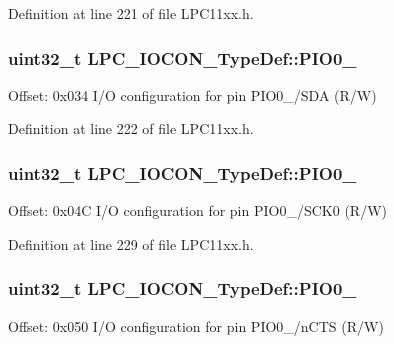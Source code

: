 Definition at line 221 of file L\+P\+C11xx.\+h.

\subsubsection[{\texorpdfstring{P\+I\+O0\+\_\+5}{PIO0_5}}]{ uint32\+\_\+t L\+P\+C\+\_\+\+I\+O\+C\+O\+N\+\_\+\+Type\+Def\+::\+P\+I\+O0\+\_}\hypertarget{group___l_p_c11xx___definitions_ga47080726daee765a484a0788c2a99228}{}\label{group___l_p_c11xx___definitions_ga47080726daee765a484a0788c2a99228}
Offset\+: 0x034 I/O configuration for pin P\+I\+O0\+\_/\+S\+DA (R/W) 

Definition at line 222 of file L\+P\+C11xx.\+h.

\subsubsection[{\texorpdfstring{P\+I\+O0\+\_\+6}{PIO0_6}}]{ uint32\+\_\+t L\+P\+C\+\_\+\+I\+O\+C\+O\+N\+\_\+\+Type\+Def\+::\+P\+I\+O0\+\_}\hypertarget{group___l_p_c11xx___definitions_ga614b18348a8f7b7604b3a3c0511eb073}{}\label{group___l_p_c11xx___definitions_ga614b18348a8f7b7604b3a3c0511eb073}
Offset\+: 0x04C I/O configuration for pin P\+I\+O0\+\_/\+S\+C\+K0 (R/W) 

Definition at line 229 of file L\+P\+C11xx.\+h.

\subsubsection[{\texorpdfstring{P\+I\+O0\+\_\+7}{PIO0_7}}]{ uint32\+\_\+t L\+P\+C\+\_\+\+I\+O\+C\+O\+N\+\_\+\+Type\+Def\+::\+P\+I\+O0\+\_}\hypertarget{group___l_p_c11xx___definitions_gaa35ec9a2c3fd40798ab1fd51cc73f465}{}\label{group___l_p_c11xx___definitions_gaa35ec9a2c3fd40798ab1fd51cc73f465}
Offset\+: 0x050 I/O configuration for pin P\+I\+O0\+\_/n\+C\+TS (R/W) 

